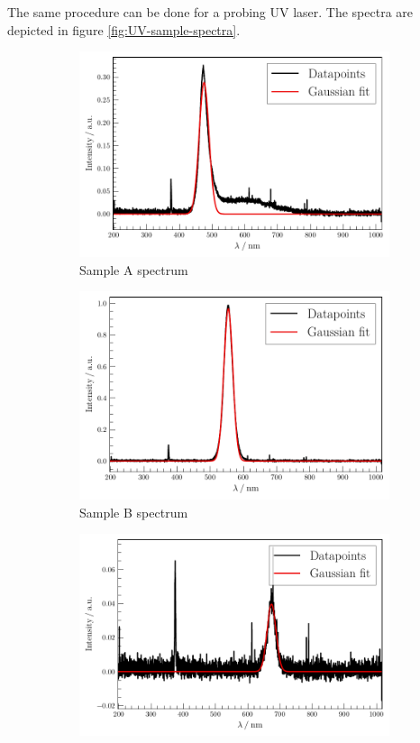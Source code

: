 The same procedure can be done for a probing UV laser. The spectra are depicted in figure \ref{fig:UV-sample-spectra}.
\begin{figure}
    \centering
\begin{subfigure}{.32\textwidth}
    \centering
    \includegraphics[width=\textwidth]{plots/Samp_A_D_UV.pdf}
    \caption{Sample A spectrum}
\end{subfigure}
\begin{subfigure}{.32\textwidth}
    \centering
    \includegraphics[width=\textwidth]{plots/Samp_B_D_UV.pdf}
    \caption{Sample B spectrum}
\end{subfigure}
\begin{subfigure}{.32\textwidth}
    \centering
    \includegraphics[width=\textwidth]{plots/Samp_C_D_UV.pdf}

\end{subfigure}
\end{figure}
